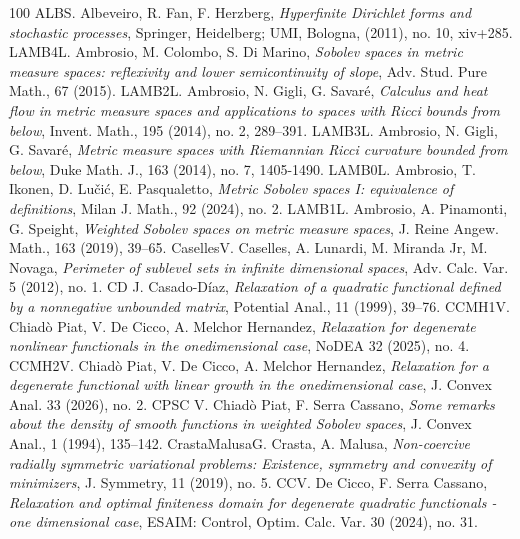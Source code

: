 \documentclass[11pt,leqno]{amsart}
\theoremstyle{remark}
\theoremstyle{definition}
\theoremstyle{definition}
\begin{document}
\begin{thebibliography}{100}
\bibitem%
{ALB}{\sc S. Albeveiro, R.  Fan, F. Herzberg}, {\em Hyperfinite {D}irichlet forms and stochastic processes}, Springer, Heidelberg; UMI, Bologna, (2011), no. 10, xiv+285.
\bibitem%
{LAMB4}{\sc L. Ambrosio, M. Colombo, S. Di Marino}, {\em Sobolev spaces in metric measure spaces: reflexivity and lower semicontinuity of slope}, Adv. Stud. Pure Math., 67 (2015).
\bibitem%
{LAMB2}{\sc L. Ambrosio, N. Gigli, G. Savar\'{e}}, {\em Calculus and heat flow in metric measure spaces and applications to spaces with {R}icci bounds from below}, Invent. Math., 195 (2014), no. 2, 289--391.
\bibitem%
{LAMB3}{\sc L. Ambrosio, N. Gigli, G. Savar\'{e}}, {\em Metric measure spaces with Riemannian Ricci curvature bounded from below}, Duke Math. J., 163 (2014), no. 7, 1405-1490.
\bibitem%
{LAMB0}{\sc L. Ambrosio, T. Ikonen, D. Lu{\v{c}}i{\'c}, E. Pasqualetto}, {\em Metric Sobolev spaces I: equivalence of definitions}, Milan J. Math., 92 (2024), no. 2.
\bibitem%
{LAMB1}{\sc L. Ambrosio, A. Pinamonti, G. Speight}, {\em Weighted {S}obolev spaces on metric measure spaces}, J. Reine Angew. Math., 163 (2019), 39--65.
\bibitem%
{Caselles}{\sc V. Caselles, A. Lunardi, M. Miranda Jr, M. Novaga}, {\em Perimeter of sublevel sets in infinite dimensional spaces}, Adv. Calc. Var. 5 (2012), no. 1.
\bibitem%
{CD} {\sc J. Casado-D\'iaz}, {\em Relaxation of a quadratic functional defined by a nonnegative unbounded matrix}, Potential Anal., { 11}  (1999), 39--76.
\bibitem%
{CCMH1}{\sc V. Chiad\`o Piat, V. De Cicco, A. Melchor Hernandez}, {\em Relaxation for degenerate nonlinear functionals in the onedimensional case}, NoDEA 32 (2025), no. 4.
\bibitem%
{CCMH2}{\sc V. Chiad\`o Piat, V. De Cicco, A. Melchor Hernandez}, {\em Relaxation for a degenerate functional with linear growth in the onedimensional case}, J. Convex Anal. 33 (2026), no. 2.
\bibitem%
{CPSC} {\sc V. Chiad\`o Piat, F. Serra Cassano}, {\em Some remarks about the density of smooth functions in weighted Sobolev spaces}, J. Convex Anal., {1}  (1994), 135--142.
\bibitem%
{CrastaMalusa}{\sc G. Crasta, A. Malusa}, {\em Non-coercive radially symmetric variational problems: Existence, symmetry and convexity of minimizers}, J. Symmetry, 11 (2019), no. 5.
\bibitem%
{CC}{\sc V. De Cicco, F. Serra Cassano}, {\em Relaxation and optimal finiteness domain for degenerate quadratic functionals - one dimensional case}, ESAIM: Control, Optim. Calc. Var. 30 (2024), no. 31.
\bibitem%

\end{thebibliography}
\end{document}
